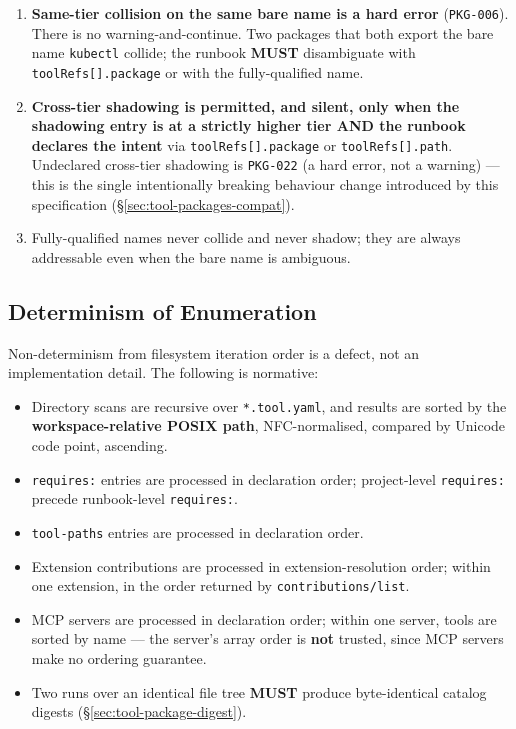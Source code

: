 \begin{enumerate}
  \item \textbf{Same-tier collision on the same bare name is a hard error}
        (\texttt{PKG-006}). There is no warning-and-continue. Two packages
        that both export the bare name \texttt{kubectl} collide; the runbook
        \textbf{MUST} disambiguate with \texttt{toolRefs[].package} or with
        the fully-qualified name.
  \item \textbf{Cross-tier shadowing is permitted, and silent, only when the
        shadowing entry is at a strictly higher tier AND the runbook
        declares the intent} via \texttt{toolRefs[].package} or
        \texttt{toolRefs[].path}. Undeclared cross-tier shadowing is
        \texttt{PKG-022} (a hard error, not a warning) --- this is the single
        intentionally breaking behaviour change introduced by this
        specification (\S\ref{sec:tool-packages-compat}).
  \item Fully-qualified names never collide and never shadow; they are
        always addressable even when the bare name is ambiguous.
\end{enumerate}

\subsection{Determinism of Enumeration}
\label{sec:tool-determinism}

Non-determinism from filesystem iteration order is a defect, not an
implementation detail. The following is normative:

\begin{itemize}
  \item Directory scans are recursive over \texttt{*.tool.yaml}, and results
        are sorted by the \textbf{workspace-relative POSIX path}, NFC-normalised,
        compared by Unicode code point, ascending.
  \item \texttt{requires:} entries are processed in declaration order;
        project-level \texttt{requires:} precede runbook-level
        \texttt{requires:}.
  \item \texttt{tool-paths} entries are processed in declaration order.
  \item Extension contributions are processed in extension-resolution order;
        within one extension, in the order returned by
        \texttt{contributions/list}.
  \item MCP servers are processed in declaration order; within one server,
        tools are sorted by name --- the server's array order is
        \textbf{not} trusted, since MCP servers make no ordering guarantee.
  \item Two runs over an identical file tree \textbf{MUST} produce
        byte-identical catalog digests (\S\ref{sec:tool-package-digest}).
\end{itemize}

